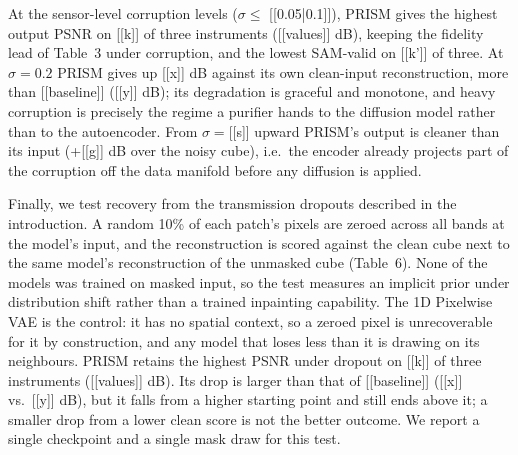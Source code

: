 At the sensor-level corruption levels ($\sigma \le$ [[0.05|0.1]]), PRISM gives
the highest output PSNR on [[k]] of three instruments ([[values]] dB), keeping
the fidelity lead of Table~3 under corruption, and the lowest SAM-valid on
[[k']] of three.
At $\sigma=0.2$ PRISM gives up [[x]] dB against its own clean-input
reconstruction, more than [[baseline]] ([[y]] dB); its degradation is graceful
and monotone, and heavy corruption is precisely the regime a purifier hands to
the diffusion model rather than to the autoencoder.
From $\sigma=$[[s]] upward PRISM's output is cleaner than its input
(+[[g]] dB over the noisy cube), i.e.\ the encoder already projects part of the
corruption off the data manifold before any diffusion is applied.



Finally, we test recovery from the transmission dropouts described in the
introduction. A random 10\% of each patch's pixels are zeroed across all bands
at the model's input, and the reconstruction is scored against the clean cube
next to the same model's reconstruction of the unmasked cube (Table~6). None of
the models was trained on masked input, so the test measures an implicit prior
under distribution shift rather than a trained inpainting capability. The 1D
Pixelwise VAE is the control: it has no spatial context, so a zeroed pixel is
unrecoverable for it by construction, and any model that loses less than it is
drawing on its neighbours.
PRISM retains the highest PSNR under dropout on [[k]] of three instruments
([[values]] dB).
Its drop is larger than that of [[baseline]] ([[x]] vs.\ [[y]] dB), but it falls
from a higher starting point and still ends above it; a smaller drop from a
lower clean score is not the better outcome.
We report a single checkpoint and a single mask draw for this test.


